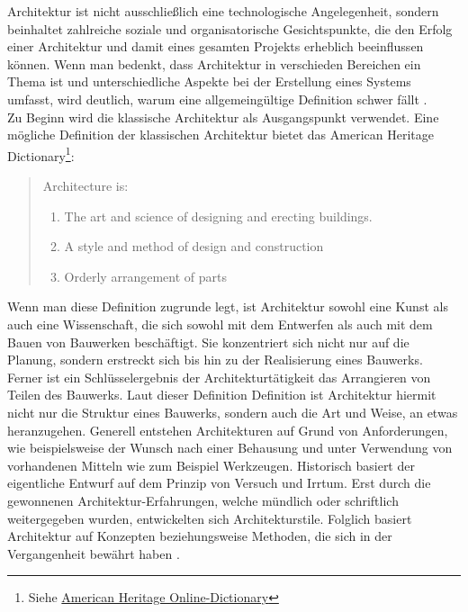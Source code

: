 Architektur ist nicht ausschließlich eine technologische Angelegenheit, sondern beinhaltet zahlreiche soziale und organisatorische Gesichtspunkte, die den Erfolg einer Architektur und damit eines gesamten Projekts erheblich beeinflussen können. Wenn man bedenkt, dass Architektur in verschieden Bereichen ein Thema ist und unterschiedliche Aspekte bei der Erstellung eines Systems umfasst, wird deutlich, warum eine allgemeingültige Definition schwer fällt \citereset \autocite{Vogel.2009}.\\
Zu Beginn wird die klassische Architektur als Ausgangspunkt verwendet. Eine mögliche Definition der klassischen Architektur bietet das \glqq American Heritage Dictionary\footnote{Siehe \href{http://ahdictionary.com/word/search.html?q=architecture&submit.x=39&submit.y=20}{American Heritage Online-Dictionary}}\grqq :
\begin{quote}
  Architecture is:
  \begin{enumerate}
    \item The art and science of designing and erecting buildings.
    \item A style and method of design and construction
    \item Orderly arrangement of parts
  \end{enumerate}
\end{quote}



Wenn man diese Definition zugrunde legt, ist Architektur sowohl eine Kunst als auch eine Wissenschaft, die sich sowohl mit dem Entwerfen als auch mit dem Bauen von Bauwerken beschäftigt. Sie konzentriert sich nicht nur auf die Planung, sondern erstreckt sich bis hin zu der Realisierung eines Bauwerks. Ferner ist ein Schlüsselergebnis der Architekturtätigkeit das Arrangieren von Teilen des Bauwerks. Laut dieser Definition Definition ist Architektur hiermit nicht nur die Struktur eines Bauwerks, sondern auch die Art und Weise, an etwas heranzugehen. Generell entstehen Architekturen auf Grund von Anforderungen, wie beispielsweise der Wunsch nach einer Behausung und unter Verwendung von vorhandenen Mitteln wie zum Beispiel Werkzeugen. Historisch basiert der eigentliche Entwurf auf dem Prinzip von Versuch und Irrtum. Erst durch die gewonnenen Architektur-Erfahrungen, welche mündlich oder schriftlich weitergegeben wurden, entwickelten sich Architekturstile. Folglich basiert Architektur auf Konzepten beziehungsweise Methoden, die sich in der Vergangenheit bewährt haben \citereset \autocite{Vogel.2009}.\\

